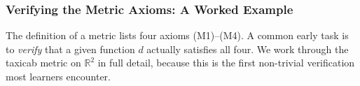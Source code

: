%

\subsubsection{Verifying the Metric Axioms: A Worked Example}
\label{sec:metric-axiom-verification}

The definition of a metric lists four axioms (M1)--(M4).
A common early task is to \emph{verify} that a given function $d$ actually
satisfies all four.
We work through the taxicab metric on $\mathbb{R}^2$ in full detail,
because this is the first non-trivial verification most learners encounter.


